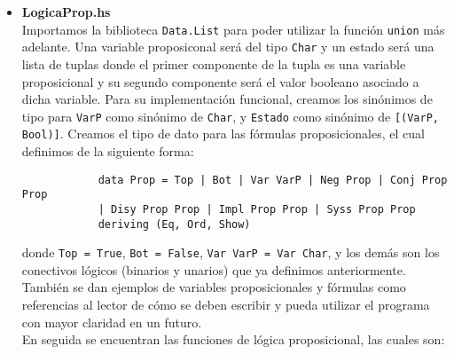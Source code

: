 \documentclass[letterpaper,11pt]{article}
\begin{document}
    \begin{itemize}
        \item \textbf{LogicaProp.hs} \\
        Importamos la biblioteca \texttt{Data.List} para poder utilizar 
        la función \texttt{union} más adelante. Una variable proposiconal 
        será del tipo \texttt{Char} y un estado será una lista de tuplas donde 
        el primer componente de la tupla es una variable proposicional y su 
        segundo componente será el valor booleano asociado a dicha variable.
        Para su implementación funcional, creamos los sinónimos de tipo para 
        \texttt{VarP} como sinónimo de \texttt{Char}, y \texttt{Estado} como 
        sinónimo de \texttt{[(VarP, Bool)]}. Creamos el tipo de dato para las 
        fórmulas proposicionales, el cual definimos de la siguiente forma:

        \begin{lstlisting}
            data Prop = Top | Bot | Var VarP | Neg Prop | Conj Prop Prop 
            | Disy Prop Prop | Impl Prop Prop | Syss Prop Prop 
            deriving (Eq, Ord, Show)
        \end{lstlisting}

        donde \texttt{Top = True}, \texttt{Bot = False}, 
        \texttt{Var VarP = Var Char}, y los demás son los conectivos lógicos
        (binarios y unarios) que ya definimos anteriormente. \\
        También se dan ejemplos de variables proposicionales y fórmulas 
        como referencias al lector de cómo se deben escribir y pueda utilizar 
        el programa con mayor claridad en un futuro. \\ 
        En seguida se encuentran las funciones de lógica proposicional, las
        cuales son:


\end{itemize}
\end{document}
